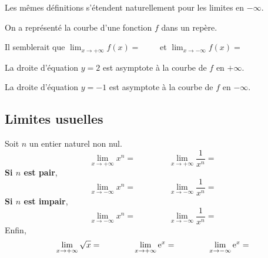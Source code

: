 \documentclass[11pt,fleqn, openany]{book} %
\begin{document}
Les mêmes définitions s'étendent naturellement pour les limites en $-\infty$.

\begin{example}On a représenté la courbe d'une fonction $f$ dans un repère.

\begin{minipage}{0.65\linewidth}
Il semblerait que $\displaystyle\lim_{x\to +\infty}f(x)=\qquad$ et $\displaystyle\lim_{x\to -\infty}f(x)=\qquad$

La droite d'équation $y=2$ est asymptote à la courbe de $f$ en $+\infty$.

La droite d'équation $y=-1$ est asymptote à la courbe de $f$ en $-\infty$.
\end{minipage}\hfill \begin{minipage}{0.3\linewidth}
\begin{flushright}

\end{flushright}\end{minipage}\end{example}


\subsection{Limites usuelles}

\begin{proposition}Soit $n$ un entier naturel non nul.
\[\displaystyle \lim_{x \to +\infty} x^n = \qquad \qquad \displaystyle \lim_{x \to +\infty} \dfrac{1}{x^n} = \]
\textbf{Si $n$ est pair}, \[\displaystyle \lim_{x \to -\infty} x^n =  \qquad \qquad \displaystyle \lim_{x \to -\infty} \dfrac{1}{x^n}=\]
\textbf{Si $n$ est impair}, 
\[\displaystyle \lim_{x \to -\infty} x^n =  \qquad \qquad \displaystyle \lim_{x \to -\infty} \dfrac{1}{x^n}=\]
Enfin, 
\[\displaystyle \lim_{x \to +\infty} \sqrt{x} =  \qquad \qquad \displaystyle \lim_{x \to +\infty} \mathrm{e}^x =  \qquad \qquad \displaystyle \lim_{x \to -\infty} \mathrm{e}^x = \]
\end{proposition}
\end{document}

